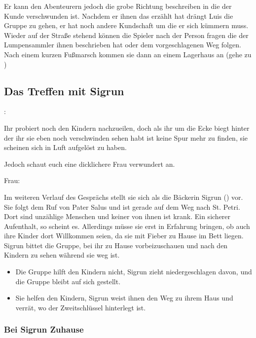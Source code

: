 Er kann den Abenteurern jedoch die grobe Richtung beschreiben in die der Kunde verschwunden ist. Nachdem er ihnen das erzählt hat drängt Luis die Gruppe zu gehen, er hat noch andere Kundschaft um die er sich kümmern muss. Wieder auf der Straße stehend können die Spieler nach der Person fragen die der Lumpensammler ihnen beschrieben hat oder dem vorgeschlagenen Weg folgen. Nach einem kurzen Fußmarsch kommen sie dann an einem Lagerhaus an (gehe zu \blue{\ref{Lagerhaus}})

\subsection{Das Treffen mit Sigrun}
\label{\neingeholt}

:

Ihr probiert noch den Kindern nachzueilen, doch als ihr um die Ecke biegt hinter der ihr sie eben noch verschwinden sehen habt ist keine Spur mehr zu finden, sie scheinen sich in Luft aufgelöst zu haben.

Jedoch schaut euch eine dicklichere Frau verwundert an.

Frau: 

Im weiteren Verlauf des Gesprächs stellt sie sich als die Bäckerin Sigrun (\blue{\ref{Sigrun}}) vor. Sie folgt dem Ruf von Pater Salus und ist gerade auf dem Weg nach St. Petri. Dort sind unzählige Menschen und keiner von ihnen ist krank. Ein sicherer Aufenthalt, so scheint es. Allerdings müsse sie erst in Erfahrung bringen, ob auch ihre Kinder dort Willkommen seien, da sie mit Fieber zu Hause im Bett liegen. Sigrun bittet die Gruppe, bei ihr zu Hause vorbeizuschauen und nach den Kindern zu sehen während sie weg ist.


\begin{itemize}
  \item Die Gruppe hilft den Kindern nicht, Sigrun zieht niedergeschlagen davon, und die Gruppe bleibt auf sich gestellt.
  \item Sie helfen den Kindern, Sigrun weist ihnen den Weg zu ihrem Haus und verrät, wo der Zweitschlüssel hinterlegt ist.
\end{itemize}

\subsubsection{Bei Sigrun Zuhause}

